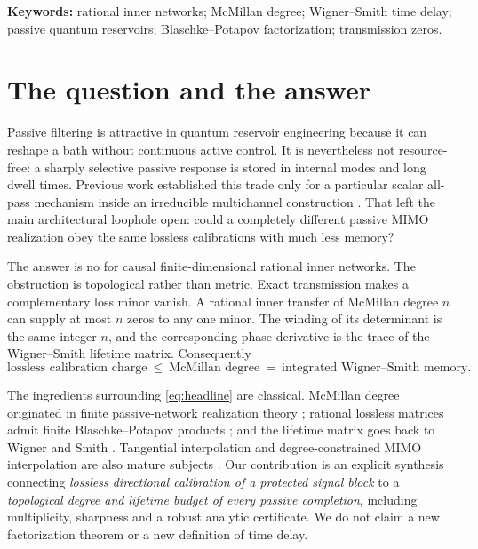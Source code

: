 \documentclass[11pt]{article}
\theoremstyle{definition}
\theoremstyle{remark}
\begin{document}
\noindent\textbf{Keywords:} rational inner networks; McMillan degree;
Wigner--Smith time delay; passive quantum reservoirs; Blaschke--Potapov
factorization; transmission zeros.

\section{The question and the answer}

Passive filtering is attractive in quantum reservoir engineering because it
can reshape a bath without continuous active control.  It is nevertheless
not resource-free: a sharply selective passive response is stored in internal
modes and long dwell times.  Previous work established this trade only for a
particular scalar all-pass mechanism inside an irreducible multichannel
construction \cite{ErikssonReservoir2026}.  That left the main architectural
loophole open: could a completely different passive MIMO realization obey the
same lossless calibrations with much less memory?

The answer is no for causal finite-dimensional rational inner networks.  The
obstruction is topological rather than metric.  Exact transmission makes a
complementary loss minor vanish.  A rational inner transfer of McMillan degree
$n$ can supply at most $n$ zeros to any one minor.  The winding of its
determinant is the same integer $n$, and the corresponding phase derivative
is the trace of the Wigner--Smith lifetime matrix.  Consequently
\begin{equation}\label{eq:headline}
 \boxed{
  \text{lossless calibration charge}
  \ \leq\ \text{McMillan degree}
  \ =\ \text{integrated Wigner--Smith memory}.}
\end{equation}

The ingredients surrounding \eqref{eq:headline} are classical.  McMillan
degree originated in finite passive-network realization theory
\cite{McMillan1952}; rational lossless matrices admit finite
Blaschke--Potapov products \cite{Potapov1955,AlpayJorgensenLewkowicz2016}; and
the lifetime matrix goes back to Wigner and Smith
\cite{Wigner1955,Smith1960}.  Tangential interpolation and degree-constrained
MIMO interpolation are also mature subjects
\cite{BallKang1990,GallivanEtAl2004,BallBolotnikov2017}.  Our contribution is an explicit synthesis connecting
\emph{lossless directional calibration of a protected signal block} to a
\emph{topological degree and lifetime budget of every passive completion},
including multiplicity, sharpness and a robust analytic certificate.  We do
not claim a new factorization theorem or a new definition of time delay.
\end{document}
